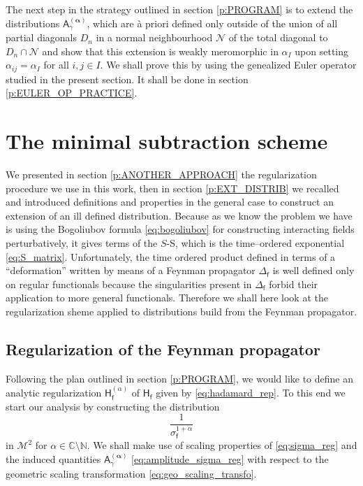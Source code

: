 \documentclass[11pt]{book}
\newcommand{\alphabd}{\boldsymbol{\alpha}}
\newcommand{\Mcal}{\mathcal{M}}
\newcommand{\Ncal}{\mathcal{N}}
\newcommand{\Cbb}{\mathbb{C}}
\newcommand{\Nbb}{\mathbb{N}}
\newcommand{\Asf}{\mathsf{A}}
\newcommand{\Hsf}{\mathsf{H}}
\newcommand{\fsf}{\mathsf{f}}
\theoremstyle{break}
\begin{document}
\bigskip


The next step in the strategy outlined in section \ref{p:PROGRAM} is to extend the distributions $\Asf^{(\alphabd)}_\gamma$, which are à priori defined only outside of the union of all partial diagonals $D_n$ in a normal neighbourhood $\Ncal$ of the total diagonal to $D_n \cap \Ncal$ and show that this extension is weakly meromorphic in $\alpha_I$ upon setting $\alpha_{ij}=\alpha_I$ for all $i,j\in I$. We shall prove this by using the genealized Euler operator studied in the present section. It shall be done in section \ref{p:EULER_OP_PRACTICE}.


\section{The minimal subtraction scheme}

We presented in section \ref{p:ANOTHER_APPROACH} the regularization procedure we use in this work, then in section \ref{p:EXT_DISTRIB} we recalled and introduced definitions and properties in the general case to construct an extension of an ill defined distribution. Because as we know the problem we have is using the Bogoliubov formula \eqref{eq:bogoliubov} for constructing interacting fields perturbatively, it gives terms of the $S$-S, which is the time--ordered exponential \eqref{eq:S_matrix}. Unfortunately, the time ordered product defined in terms of a ``deformation'' written by means of a Feynman propagator $\Delta_\fsf$ is well defined only on regular functionals because the singularities present in $\Delta_\fsf$ forbid their application to more general functionals. Therefore we shall here look at the regularization sheme applied to distributions build from the Feynman propagator.


\subsection{Regularization of the Feynman propagator}
\label{p:REG_FEYNMAN_PROP}


Following the plan outlined in section \ref{p:PROGRAM}, we would like to define an analytic regularization $\Hsf^{(\alpha)}_\fsf$ of $\Hsf_\fsf$ given by \eqref{eq:hadamard_rep}. To this end we start our analysis by constructing the distribution 
%
\begin{equation}
\frac{1}{\sigma_\fsf^{1+\alpha}}
\label{eq:sigma_reg}
\end{equation}
%
in $\Mcal^2$ for $\alpha \in \Cbb \setminus \Nbb$. We shall make use of scaling properties of
\eqref{eq:sigma_reg} and the induced quantities $\Asf^{(\alphabd)}_\gamma$ \eqref{eq:amplitude_sigma_reg} with respect to the geometric scaling transformation \eqref{eq:geo_scaling_transfo}.
\end{document}
